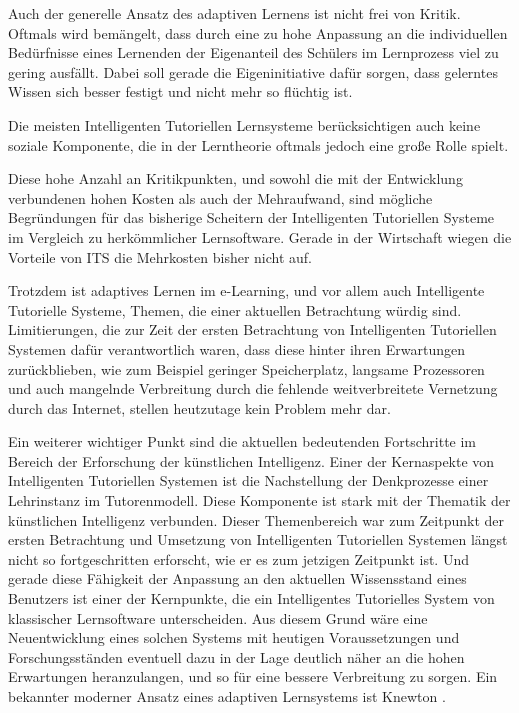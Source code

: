 Auch der generelle Ansatz des adaptiven Lernens ist nicht frei von Kritik. Oftmals wird bemängelt, dass durch eine
zu hohe Anpassung an die individuellen Bedürfnisse eines Lernenden der Eigenanteil des Schülers
im Lernprozess viel zu gering ausfällt. Dabei soll gerade die Eigeninitiative
dafür sorgen, dass gelerntes Wissen sich besser festigt und nicht mehr so flüchtig ist.

Die meisten Intelligenten Tutoriellen Lernsysteme berücksichtigen auch keine soziale Komponente, die in der Lerntheorie
oftmals jedoch eine große Rolle spielt.

Diese hohe Anzahl an Kritikpunkten, und sowohl die mit der Entwicklung verbundenen hohen Kosten als auch der Mehraufwand,
sind mögliche Begründungen für das bisherige Scheitern der Intelligenten Tutoriellen Systeme im Vergleich
zu herkömmlicher Lernsoftware. Gerade in der Wirtschaft wiegen die Vorteile von ITS die Mehrkosten bisher nicht auf.

Trotzdem ist adaptives Lernen im e-Learning, und vor allem auch Intelligente Tutorielle Systeme, Themen,
die einer aktuellen Betrachtung würdig sind. Limitierungen, die zur Zeit der ersten Betrachtung von Intelligenten Tutoriellen Systemen
dafür verantwortlich waren, dass diese hinter ihren Erwartungen zurückblieben, wie zum Beispiel geringer Speicherplatz, langsame Prozessoren
und auch mangelnde Verbreitung durch die fehlende weitverbreitete Vernetzung durch das Internet, stellen heutzutage kein Problem mehr dar.

Ein weiterer wichtiger Punkt sind die aktuellen bedeutenden Fortschritte im Bereich der Erforschung der künstlichen Intelligenz.
Einer der Kernaspekte von Intelligenten Tutoriellen Systemen ist die Nachstellung der Denkprozesse einer Lehrinstanz im Tutorenmodell.
Diese Komponente ist stark mit der Thematik der künstlichen Intelligenz verbunden. Dieser Themenbereich war zum Zeitpunkt der ersten Betrachtung und Umsetzung von
Intelligenten Tutoriellen Systemen längst nicht so fortgeschritten erforscht, wie er es zum jetzigen Zeitpunkt ist. Und gerade diese Fähigkeit der Anpassung
an den aktuellen Wissensstand eines Benutzers ist einer der Kernpunkte, die ein Intelligentes Tutorielles System von klassischer Lernsoftware unterscheiden.
Aus diesem Grund wäre eine Neuentwicklung eines solchen Systems mit heutigen Voraussetzungen und Forschungsständen eventuell dazu in der Lage
deutlich näher an die hohen Erwartungen heranzulangen, und so für eine bessere Verbreitung zu sorgen.
Ein bekannter moderner Ansatz eines adaptiven Lernsystems ist Knewton \cite{knewton}.
